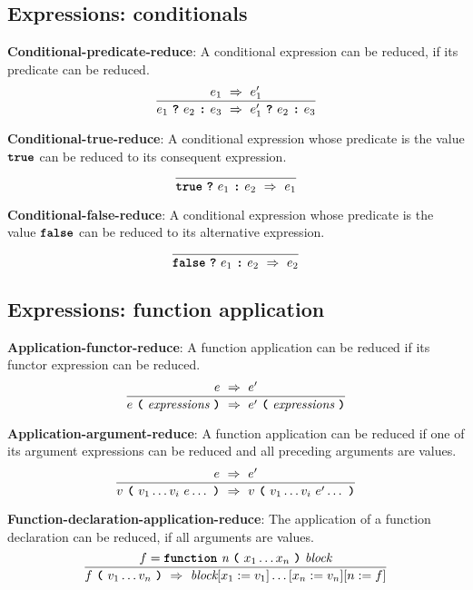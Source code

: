 \subsection*{Expressions: conditionals}

\textbf{Conditional-predicate-reduce}: A conditional
expression can be reduced, if its predicate can be reduced.
\[
\frac{
  e_1 \ \Rightarrow \ e_1'
}{
  e_1\  \textbf{\texttt{?}}\ e_2\ \textbf{\texttt{:}}\ e_3
  \ \Rightarrow \ 
  e_1'\ \textbf{\texttt{?}}\ e_2\ \textbf{\texttt{:}}\ e_3
}
\]

\vspace{10mm}
\textbf{Conditional-true-reduce}: A conditional
expression whose predicate is the value
$\textbf{\texttt{true}}$
can be reduced to its consequent expression.
\[
\frac{
}{
  \textbf{\texttt{true}}\  \textbf{\texttt{?}}\ e_1\ \textbf{\texttt{:}}\ e_2
  \ \Rightarrow \ 
  e_1
}
\]

\vspace{10mm}
\textbf{Conditional-false-reduce}: A conditional
expression whose predicate is the value
$\textbf{\texttt{false}}$
can be reduced to its alternative expression.
\[
\frac{
}{
  \textbf{\texttt{false}}\  \textbf{\texttt{?}}\ e_1\ \textbf{\texttt{:}}\ e_2
  \ \Rightarrow \ 
  e_2
}
\]


\subsection*{Expressions: function application}

\textbf{Application-functor-reduce}: A function application
can be reduced if its functor expression can be reduced.
\[
\frac{
  e \ \Rightarrow \ e'
}{
  e\  \textbf{\texttt{(}}\ \textit{expressions} \ \textbf{\texttt{)}}
  \ \Rightarrow \ 
  e'\  \textbf{\texttt{(}}\ \textit{expressions} \ \textbf{\texttt{)}}
}
\]


\vspace{10mm}
\textbf{Application-argument-reduce}: A function application
can be reduced if one of its argument expressions can be reduced and all
preceding arguments are values.
\[
\frac{
  e \ \Rightarrow \ e'
}{
  v\  \textbf{\texttt{(}}\ v_1 \ldots v_i \ e \ldots\ \textbf{\texttt{)}}
  \ \Rightarrow \ 
  v\  \textbf{\texttt{(}}\ v_1 \ldots v_i \ e' \ldots\ \textbf{\texttt{)}}
}
\]



\vspace{10mm}
\textbf{Function-declaration-application-reduce}:
The application of a function declaration
can be reduced, if all
arguments are values. 
\[
\frac{
  f = \textbf{\texttt{function}}\  \textit{n} \ 
                 \textbf{\texttt{(}}\  x_1 \ldots x_n
                 \ \textbf{\texttt{)}}\ \textit{block}
}{
  f\ \textbf{\texttt{(}}\ v_1 \ldots v_n\ \textbf{\texttt{)}}
  \ \Rightarrow \ 
  \textit{block} [x_1 := v_1]\ldots[x_n := v_n]
  [n := f]
}
\]

